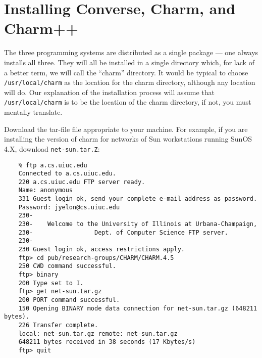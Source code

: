 %
%
%
%
%
%
%
%
%
%
%
%
%
%

\section{Installing Converse, Charm, and Charm++}

The three programming systems are distributed as a single package ---
one always installs all three.  They will all be installed in a single
directory which, for lack of a better term, we will call the ``charm''
directory.  It would be typical to choose {\tt /usr/local/charm} as
the location for the charm directory, although any location will do.
Our explanation of the installation process will assume that {\tt
/usr/local/charm} is to be the location of the charm directory,
if not, you must mentally translate.

Download the tar-file file appropriate to your machine.  For example,
if you are installing the version of charm for networks of Sun
workstations running SunOS 4.X, download {\tt net-sun.tar.Z}:

\begin{verbatim}
    % ftp a.cs.uiuc.edu
    Connected to a.cs.uiuc.edu.
    220 a.cs.uiuc.edu FTP server ready.
    Name: anonymous
    331 Guest login ok, send your complete e-mail address as password.
    Password: jyelon@cs.uiuc.edu
    230-
    230-    Welcome to the University of Illinois at Urbana-Champaign,
    230-                 Dept. of Computer Science FTP server.
    230-
    230 Guest login ok, access restrictions apply.
    ftp> cd pub/research-groups/CHARM/CHARM.4.5
    250 CWD command successful.
    ftp> binary
    200 Type set to I.
    ftp> get net-sun.tar.gz
    200 PORT command successful.
    150 Opening BINARY mode data connection for net-sun.tar.gz (648211 bytes).
    226 Transfer complete.
    local: net-sun.tar.gz remote: net-sun.tar.gz
    648211 bytes received in 38 seconds (17 Kbytes/s)
    ftp> quit
\end{verbatim}

